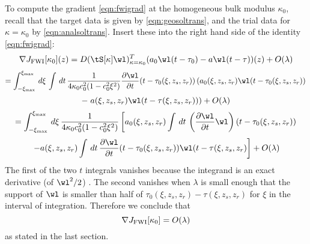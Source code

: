 To compute the gradient \ref{eqn:fwigrad} at the homogeneous bulk
modulus $\kappa_0$, recall that the target data is
given by \ref{eqn:geosoltrans}, and the trial data for
$\kappa=\kappa_0$ by \ref{eqn:analsoltrans}. Insert these into the
right hand side of the identity \ref{eqn:fwigrad}:
\[
  \nabla J_{\rm FWI}[\kappa_0](z) =
  D(\tS[\kappa]\wl)_{\kappa=\kappa_0}^T(a_0\wl(t-\tau_0)
  -a\wl(t-\tau))(z) + O(\lambda)
\]
\[
=  \int_{-\xi_{\rm max}}^{\xi_{\rm max}}\,d\xi\,\int\,dt\,
\frac{1}{4\kappa_0c_0^2(1-c_0^2\xi^2)}
\frac{\partial \wl}{\partial
    t}(t - \tau_0(\xi,z_s,z_r))
  \left(a_0(\xi,z_s,z_r)\wl(t-\tau_0(\xi,z_s,z_r) )\right.
\]
\[
-
\left.  a(\xi,z_s,z_r)\wl(t-\tau(\xi,z_s,z_r))\right) + O(\lambda)
\]
\[
  = \int_{-\xi_{\rm max}}^{\xi_{\rm max}}\,d\xi\,
\frac{1}{4\kappa_0c_0^2(1-c_0^2\xi^2)}\left[a_0(\xi,z_s,z_r) \int \,
  dt \, \left(\frac{\partial \wl}{\partial t}\wl  \right)
  (t-\tau_0(\xi,z_s,z_r))
\right.
\]
\[
  \left.
- a(\xi,z_s,z_r) \int\,dt\,\frac{\partial \wl}{\partial t} 
  (t-\tau_0(\xi,z_s,z_r)) \wl(t-\tau(\xi,z_s,z_r)\right] + O(\lambda)
\]
The first of the two $t$ integrals vanishes because the integrand is
an exact derivative (of $\wl^2/2$) . The second vanishes when
$\lambda$ is small enough that the support of $\wl$ is smaller than
half of $\tau_0(\xi,z_s,z_r)-\tau(\xi,z_s,z_r)$ for $\xi$ in the
interval of integration. Therefore we conclude that
\[
  \nabla J_{\rm FWI}[\kappa_0] = O(\lambda)
\]
as stated in the last section.

